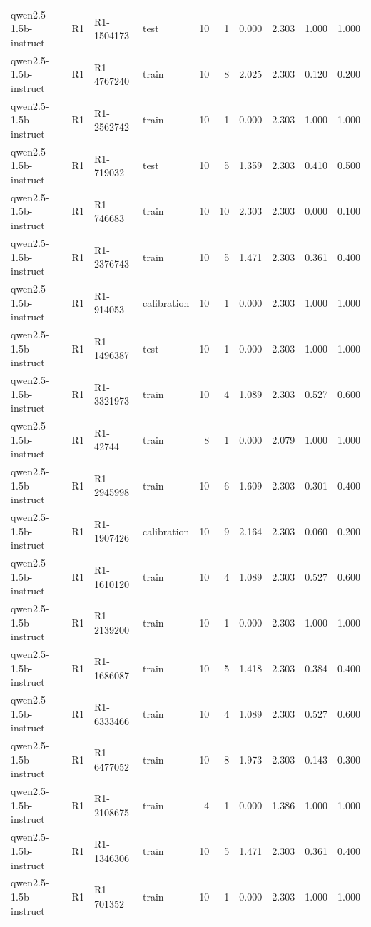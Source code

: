 \begin{table}
\begin{tabular}{llllrrrrrr}
qwen2.5-1.5b-instruct & R1 & R1-1504173 & test & 10 & 1 & 0.000 & 2.303 & 1.000 & 1.000 \\
qwen2.5-1.5b-instruct & R1 & R1-4767240 & train & 10 & 8 & 2.025 & 2.303 & 0.120 & 0.200 \\
qwen2.5-1.5b-instruct & R1 & R1-2562742 & train & 10 & 1 & 0.000 & 2.303 & 1.000 & 1.000 \\
qwen2.5-1.5b-instruct & R1 & R1-719032 & test & 10 & 5 & 1.359 & 2.303 & 0.410 & 0.500 \\
qwen2.5-1.5b-instruct & R1 & R1-746683 & train & 10 & 10 & 2.303 & 2.303 & 0.000 & 0.100 \\
qwen2.5-1.5b-instruct & R1 & R1-2376743 & train & 10 & 5 & 1.471 & 2.303 & 0.361 & 0.400 \\
qwen2.5-1.5b-instruct & R1 & R1-914053 & calibration & 10 & 1 & 0.000 & 2.303 & 1.000 & 1.000 \\
qwen2.5-1.5b-instruct & R1 & R1-1496387 & test & 10 & 1 & 0.000 & 2.303 & 1.000 & 1.000 \\
qwen2.5-1.5b-instruct & R1 & R1-3321973 & train & 10 & 4 & 1.089 & 2.303 & 0.527 & 0.600 \\
qwen2.5-1.5b-instruct & R1 & R1-42744 & train & 8 & 1 & 0.000 & 2.079 & 1.000 & 1.000 \\
qwen2.5-1.5b-instruct & R1 & R1-2945998 & train & 10 & 6 & 1.609 & 2.303 & 0.301 & 0.400 \\
qwen2.5-1.5b-instruct & R1 & R1-1907426 & calibration & 10 & 9 & 2.164 & 2.303 & 0.060 & 0.200 \\
qwen2.5-1.5b-instruct & R1 & R1-1610120 & train & 10 & 4 & 1.089 & 2.303 & 0.527 & 0.600 \\
qwen2.5-1.5b-instruct & R1 & R1-2139200 & train & 10 & 1 & 0.000 & 2.303 & 1.000 & 1.000 \\
qwen2.5-1.5b-instruct & R1 & R1-1686087 & train & 10 & 5 & 1.418 & 2.303 & 0.384 & 0.400 \\
qwen2.5-1.5b-instruct & R1 & R1-6333466 & train & 10 & 4 & 1.089 & 2.303 & 0.527 & 0.600 \\
qwen2.5-1.5b-instruct & R1 & R1-6477052 & train & 10 & 8 & 1.973 & 2.303 & 0.143 & 0.300 \\
qwen2.5-1.5b-instruct & R1 & R1-2108675 & train & 4 & 1 & 0.000 & 1.386 & 1.000 & 1.000 \\
qwen2.5-1.5b-instruct & R1 & R1-1346306 & train & 10 & 5 & 1.471 & 2.303 & 0.361 & 0.400 \\
qwen2.5-1.5b-instruct & R1 & R1-701352 & train & 10 & 1 & 0.000 & 2.303 & 1.000 & 1.000 \\

\end{tabular}
\end{table}
